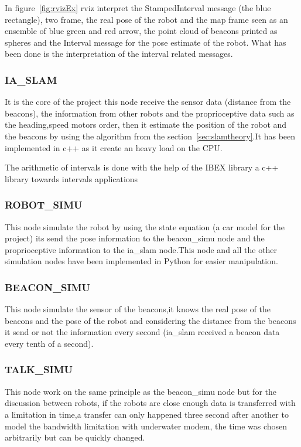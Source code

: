 In figure~\ref{fig:rvizEx} rviz interpret the StampedInterval message (the blue rectangle), two frame, the real pose of the robot and the map frame seen as an ensemble of blue green and red arrow, the point cloud of beacons printed as spheres and the Interval message for the pose estimate of the robot.
What has been done is the interpretation of the interval related messages.

\subsubsection*{IA\_SLAM}

It is the core of the project this node receive the sensor data (distance from the beacons), the information from other robots and the proprioceptive data such as the heading,speed motors order, then it estimate the position of the robot and the beacons by using the algorithm from the section~\ref{sec:slamtheory}.It has been implemented in c++ as it create an heavy load on the CPU.

The arithmetic of intervals is done with the help of the IBEX library a c++ library towards intervals applications~\cite{ibex}
\subsubsection*{ROBOT\_SIMU}

This node simulate the robot by using the state equation (a car model for the project) its send the pose information to the beacon\_simu node and the proprioceptive information to the ia\_slam node.This node and all the other simulation nodes have been implemented in Python for easier manipulation.

\subsubsection*{BEACON\_SIMU}

This node simulate the sensor of the beacons,it knows the real pose of the beacons and the pose of the robot and considering the distance from the beacons it send or not the information every second (ia\_slam received a beacon data every tenth of a second).

\subsubsection*{TALK\_SIMU}

This node work on the same principle as the beacon\_simu node but for the discussion between robots, if the robots are close enough data is transferred with a limitation in time,a transfer can only happened three second after another to model the bandwidth limitation with underwater modem, the time was chosen arbitrarily but can be quickly changed.

